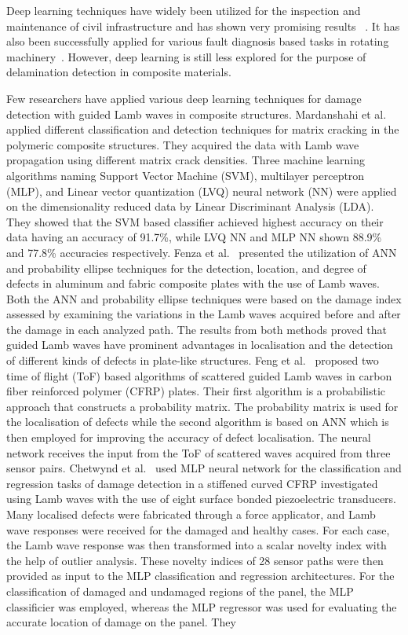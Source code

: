 Deep learning techniques have widely been utilized for the inspection and maintenance of civil infrastructure and has shown very promising results ~\cite{cha2017deep, lin2017structural, liu2019computer}. It has also been successfully applied for various fault diagnosis based tasks in rotating machinery~\cite{jia2016deep, janssens2016convolutional}. However, deep learning is still less explored for the purpose of delamination detection in composite materials.   

Few researchers have applied various deep learning techniques for damage detection with guided Lamb waves in composite structures. Mardanshahi et al.~\cite{mardanshahi2020detection} applied different classification and detection techniques for matrix cracking in the polymeric composite structures. They acquired the data with Lamb wave propagation using different matrix crack densities. Three machine learning algorithms naming Support Vector Machine (SVM), multilayer perceptron (MLP), and Linear vector quantization (LVQ) neural network (NN) were applied on the dimensionality reduced data by Linear Discriminant Analysis (LDA). They showed that the SVM based classifier achieved highest accuracy on their data having an accuracy of 91.7\%, while LVQ NN and MLP NN shown 88.9\% and 77.8\% accuracies respectively. Fenza et al.~\cite{de2015application} presented the utilization of ANN and probability ellipse techniques for the detection, location, and degree of defects in aluminum and fabric composite plates with the use of Lamb waves. Both the ANN and probability ellipse techniques were based on the damage index assessed by examining the variations in the Lamb waves acquired before and after the damage in each analyzed path. The results from both methods proved that guided Lamb waves have prominent advantages in localisation and the detection of different kinds of defects in plate-like structures. Feng et al.~\cite{feng2019locating} proposed two time of flight (ToF) based algorithms of scattered guided Lamb waves in carbon fiber reinforced polymer (CFRP) plates. Their first algorithm is a probabilistic approach that constructs a probability matrix. The probability matrix is used for the localisation of defects while the second algorithm is based on ANN which is then employed for improving the accuracy of defect localisation. The neural network receives the input from the ToF of scattered waves acquired from three sensor pairs. Chetwynd et al.~\cite{chetwynd2008damage} used MLP neural network for the classification and regression tasks of damage detection in a stiffened curved CFRP investigated using Lamb waves with the use of eight surface bonded piezoelectric transducers. Many localised defects were fabricated through a force applicator, and Lamb wave responses were received for the damaged and healthy cases. For each case, the Lamb wave response was then transformed into a scalar novelty index with the help of outlier analysis. These novelty indices of 28 sensor paths were then provided as input to the MLP classification and regression architectures. For the classification of damaged and undamaged regions of the panel, the MLP classificier was employed, whereas the MLP regressor was used for evaluating the accurate location of damage on the panel. They 
